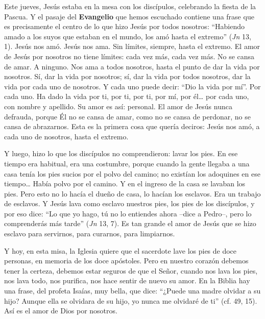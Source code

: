 			\begin{body}Este jueves, Jesús estaba en la mesa con los discípulos, celebrando la fiesta de la Pascua. Y el pasaje del \textbf{Evangelio} que hemos escuchado contiene una frase que es precisamente el centro de lo que hizo Jesús por todos nosotros: “Habiendo amado a los suyos que estaban en el mundo, los amó hasta el extremo” (\textit{Jn} 13, 1). Jesús nos amó. Jesús nos ama. Sin límites, siempre, hasta el extremo. El amor de Jesús por nosotros no tiene límites: cada vez más, cada vez más. No se cansa de amar. A ninguno. Nos ama a todos nosotros, hasta el punto de dar la vida por nosotros. Sí, dar la vida por nosotros; sí, dar la vida por todos nosotros, dar la vida por cada uno de nosotros. Y cada uno puede decir: “Dio la vida por mí”. Por cada uno. Ha dado la vida por ti, por ti, por ti, por mí, por él… por cada uno, con nombre y apellido. Su amor es así: personal. El amor de Jesús nunca defrauda, porque Él no se cansa de amar, como no se cansa de perdonar, no se cansa de abrazarnos. Esta es la primera cosa que quería deciros: Jesús nos amó, a cada uno de nosotros, hasta el extremo.\end{body}
			
			\begin{body}Y luego, hizo lo que los discípulos no comprendieron: lavar los pies. En ese tiempo era habitual, era una costumbre, porque cuando la gente llegaba a una casa tenía los pies sucios por el polvo del camino; no existían los adoquines en ese tiempo… Había polvo por el camino. Y en el ingreso de la casa se lavaban los pies. Pero esto no lo hacía el dueño de casa, lo hacían los esclavos. Era un trabajo de esclavos. Y Jesús lava como esclavo nuestros pies, los pies de los discípulos, y por eso dice: “Lo que yo hago, tú no lo entiendes ahora –dice a Pedro–, pero lo comprenderás más tarde” (\textit{Jn} 13, 7). Es tan grande el amor de Jesús que se hizo esclavo para servirnos, para curarnos, para limpiarnos.\end{body}
			
			\begin{body}Y hoy, en esta misa, la Iglesia quiere que el sacerdote lave los pies de doce personas, en memoria de los doce apóstoles. Pero en nuestro corazón debemos tener la certeza, debemos estar seguros de que el Señor, cuando nos lava los pies, nos lava todo, nos purifica, nos hace sentir de nuevo su amor. En la Biblia hay una frase, del profeta Isaías, muy bella, que dice: “¿Puede una madre olvidar a su hijo? Aunque ella se olvidara de su hijo, yo nunca me olvidaré de ti” (cf. 49, 15). Así es el amor de Dios por nosotros.\end{body}
			
